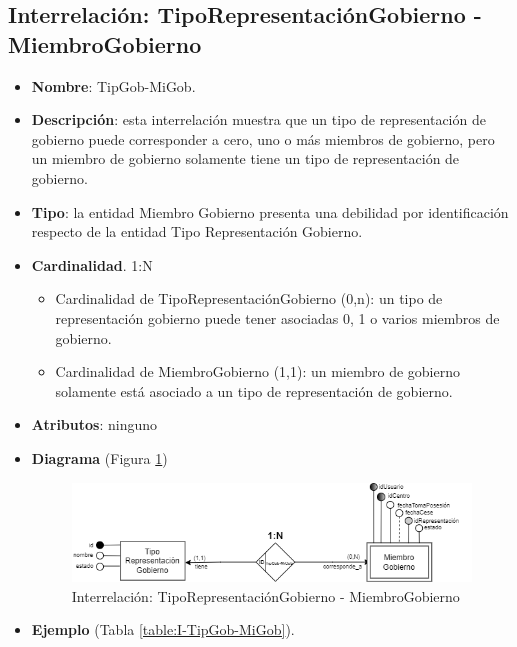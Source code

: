 \subsection{Interrelación: TipoRepresentaciónGobierno - MiembroGobierno }
\begin{itemize}
    \item \textbf{Nombre}: TipGob-MiGob.
    \item \textbf{Descripción}: esta interrelación muestra que un tipo de representación de gobierno puede corresponder a cero, uno o más miembros de gobierno, pero un miembro de gobierno solamente tiene un tipo de representación de gobierno.
    \item \textbf{Tipo}: la entidad Miembro Gobierno presenta una debilidad por identificación respecto de la entidad Tipo Representación Gobierno.
    \item \textbf{Cardinalidad}. 1:N
    \begin{itemize}
        \item Cardinalidad de TipoRepresentaciónGobierno (0,n): un tipo de representación gobierno puede tener asociadas 0, 1 o varios miembros de gobierno.
        \item Cardinalidad de MiembroGobierno (1,1): un miembro de gobierno solamente está asociado a un tipo de representación de gobierno.
    \end{itemize}
    \item \textbf{Atributos}: ninguno
    \item \textbf{Diagrama} (Figura \ref{fig:I-TipGob-MiGob}) 
    \begin{figure}[H]
        \centering
        \includegraphics[scale=0.7]{img/diagramas/EER/I-TipGob-MiGob.png}
        \caption{Interrelación: TipoRepresentaciónGobierno - MiembroGobierno}
        \label{fig:I-TipGob-MiGob}
    \end{figure}
    
    \item \textbf{Ejemplo} (Tabla \ref{table:I-TipGob-MiGob}).


\end{itemize}

